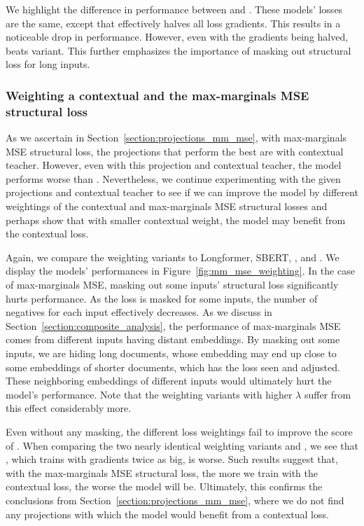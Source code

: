 We highlight the difference in performance between 
and . These models' losses are the same, except
that  effectively halves all loss gradients. This results in a
noticeable drop in performance. However, even with the gradients being halved,
 beats  variant. This further
emphasizes the importance of masking out structural loss for long inputs.

\subsubsection{Weighting a contextual and the max-marginals MSE structural
loss}

As we ascertain in Section~\ref{section:projections_mm_mse}, with max-marginals
MSE structural loss, the projections that perform the best are
 with  contextual
teacher. However, even with this projection and contextual teacher, the model
performs worse than . Nevertheless, we continue
experimenting with the given projections and contextual teacher to see if we
can improve the model by different weightings of the contextual and
max-marginals MSE structural losses and perhaps show that with smaller
contextual weight, the model may benefit from the contextual loss.

Again, we compare the weighting variants to Longformer, SBERT, ,
and . We display the models' performances in
Figure~\ref{fig:mm_mse_weighting}. In the case of max-marginals MSE, masking
out some inputs' structural loss significantly hurts performance. As the loss is masked for some inputs, the number of negatives for
each input effectively decreases. As we discuss in
Section~\ref{section:composite_analysis}, the performance of max-marginals MSE comes from different inputs having distant embeddings. By masking out some inputs, we are hiding long documents, whose embedding may end up close to some embeddings of shorter documents, which has the loss seen and adjusted. These neighboring embeddings of different inputs would ultimately hurt the model's performance. Note that the weighting variants
with higher $\lambda$ suffer from this effect considerably more.

Even without any masking, the different loss weightings fail to improve the
score of . When comparing the two nearly
identical weighting variants  and
, we see that , which trains
with gradients twice as big, is worse. Such results suggest that, with the
max-marginals MSE structural loss, the more we train with the contextual loss,
the worse the model will be. Ultimately, this confirms the conclusions
from Section~\ref{section:projections_mm_mse}, where we do not find any
projections with which the model would benefit from a contextual loss.

